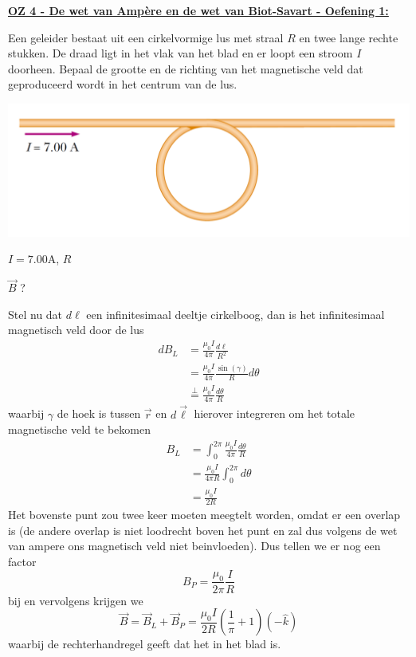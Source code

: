 \textbf{\underline{OZ 4 - De wet van Ampère en de wet van Biot-Savart - Oefening 1:}}
\vspace{0.5cm}

Een geleider bestaat uit een cirkelvormige lus met straal $R$ en twee lange rechte stukken. De draad ligt in het vlak van het blad en er loopt een stroom $I$ doorheen. Bepaal de grootte en de richting van het magnetische veld dat geproduceerd wordt in het centrum van de lus.

\begin{center}
    \includegraphics[scale = 0.5]{oz04/resources/Oz4Oef1.png}
\end{center}

\begin{description}[labelwidth=1.5cm, leftmargin=!]
    \item[Geg. :]   $I = 7.00$A, $R$
    \item[Gevr. :]  $\Vec{B}$ ?
    \item[Opl. :]  
    Stel nu dat $d\ell$ een infinitesimaal deeltje cirkelboog, dan is het infinitesimaal magnetisch veld door de lus
    \begin{align*}
        dB_L
            &= \frac{\mu_0I}{4\pi}\frac{d\ell}{R^2} \\
            &= \frac{\mu_0I}{4\pi}\frac{\sin(\gamma)}{R}d\theta \\
            &\overset{\perp}{=} \frac{\mu_0I}{4\pi}\frac{d\theta}{R} 
    \end{align*}
    waarbij $\gamma$ de hoek is tussen $\Vec{r}$ en $d\Vec{\ell}$ hierover integreren om het totale magnetische veld te bekomen
    \begin{align*}
        B_L
            &= \int_{0}^{2\pi} \frac{\mu_0I}{4\pi}\frac{d\theta}{R}  \\
            &= \frac{\mu_0I}{4\pi R} \int_{0}^{2\pi}d\theta \\
            &=  \frac{\mu_0I}{2R}
    \end{align*}
    Het bovenste punt zou twee keer moeten meegtelt worden, omdat er een overlap is (de andere overlap is niet loodrecht boven het punt en zal dus volgens de wet van ampere ons magnetisch veld niet beinvloeden). Dus tellen we er nog een factor
    \begin{equation*}
        B_P = \frac{\mu_0}{2\pi}\frac{I}{R}
    \end{equation*}
    bij en vervolgens krijgen we
    \begin{equation*}
        \Vec{B} = \Vec{B}_L + \Vec{B}_P = \frac{\mu_0I}{2R}\left(\frac{1}{\pi} + 1\right)(-\hat{k})
    \end{equation*}
    waarbij de rechterhandregel geeft dat het in het blad is.
\end{description}

\vspace{1cm}